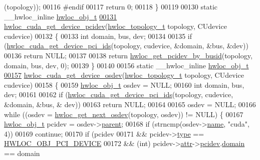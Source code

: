 \begin{DoxyCode}
{      (topology));
00116 \textcolor{preprocessor}{#endif}
00117   \textcolor{keywordflow}{return} 0;
00118 \}
00119 
00130 \textcolor{keyword}{static} \_\_hwloc\_inline \hyperlink{a00238}{hwloc\_obj\_t}
\hyperlink{a00219_ga11fed607fa404e29e8da010f3ec128e4}{00131} \hyperlink{a00219_ga11fed607fa404e29e8da010f3ec128e4}{hwloc\_cuda\_get\_device\_pcidev}(\hyperlink{a00186_ga9d1e76ee15a7dee158b786c30b6a6e38}{hwloc\_topology\_t} topology, 
      CUdevice cudevice)
00132 \{
00133   \textcolor{keywordtype}{int} domain, bus, dev;
00134 
00135   \textcolor{keywordflow}{if} (\hyperlink{a00219_ga1084285e8ff8b7df91c28917637481c6}{hwloc\_cuda\_get\_device\_pci\_ids}(topology, cudevice, &domain, &bus, &dev))
00136     \textcolor{keywordflow}{return} NULL;
00137 
00138   \textcolor{keywordflow}{return} \hyperlink{a00204_gacdbaf0db98872e224b7883a84bfb0455}{hwloc\_get\_pcidev\_by\_busid}(topology, domain, bus, dev, 0);
00139 \}
00140 
00156 \textcolor{keyword}{static} \_\_hwloc\_inline \hyperlink{a00238}{hwloc\_obj\_t}
\hyperlink{a00219_ga252cb72175f1a2d682f883a0add80a66}{00157} \hyperlink{a00219_ga252cb72175f1a2d682f883a0add80a66}{hwloc\_cuda\_get\_device\_osdev}(\hyperlink{a00186_ga9d1e76ee15a7dee158b786c30b6a6e38}{hwloc\_topology\_t} topology, CUdevice 
      cudevice)
00158 \{
00159         \hyperlink{a00238}{hwloc\_obj\_t} osdev = NULL;
00160         \textcolor{keywordtype}{int} domain, bus, dev;
00161 
00162         \textcolor{keywordflow}{if} (\hyperlink{a00219_ga1084285e8ff8b7df91c28917637481c6}{hwloc\_cuda\_get\_device\_pci\_ids}(topology, cudevice, &domain, &bus, &
      dev))
00163                 \textcolor{keywordflow}{return} NULL;
00164 
00165         osdev = NULL;
00166         \textcolor{keywordflow}{while} ((osdev = \hyperlink{a00204_ga8b4584c8949e2c5f1c97ba7fe92b8145}{hwloc\_get\_next\_osdev}(topology, osdev)) != NULL) \{
00167                 \hyperlink{a00238}{hwloc\_obj\_t} pcidev = osdev->\hyperlink{a00238_adc494f6aed939992be1c55cca5822900}{parent};
00168                 \textcolor{keywordflow}{if} (strncmp(osdev->\hyperlink{a00238_abb709ec38f2970677e4e57d1d30be96d}{name}, \textcolor{stringliteral}{"cuda"}, 4))
00169                         \textcolor{keywordflow}{continue};
00170                 \textcolor{keywordflow}{if} (pcidev
00171                     && pcidev->\hyperlink{a00238_acc4f0803f244867e68fe0036800be5de}{type} == \hyperlink{a00184_ggacd37bb612667dc437d66bfb175a8dc55a5d8117a54df1fbd3606ab19e42cb0ea9}{HWLOC\_OBJ\_PCI\_DEVICE}
00172                     && (\textcolor{keywordtype}{int}) pcidev->\hyperlink{a00238_accd40e29f71f19e88db62ea3df02adc8}{attr}->\hyperlink{a00242_a4203d713ce0f5beaa6ee0e9bdac70828}{pcidev}.\hyperlink{a00262_a8fba44988deb98613c1505a4019a34dc}{domain} == domain
}
\end{DoxyCode}

